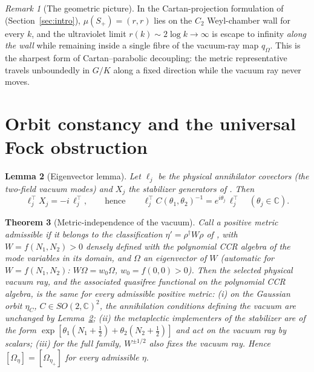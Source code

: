 \documentclass[11pt]{article}
\newtheorem{theorem}{Theorem}[section]
\newtheorem{lemma}[theorem]{Lemma}
\theoremstyle{definition}
\theoremstyle{remark}
\newtheorem{remark}[theorem]{Remark}
\newcommand{\C}{\mathbb{C}}
\newcommand{\dg}{\dagger}
\begin{document}
\begin{remark}[The geometric picture]\label{rem:wall}
In the Cartan-projection formulation of \cite{companion2}
(Section~\ref{sec:intro}), $\mu(S_+)=(r,r)$ lies on the $C_2$
Weyl-chamber wall for every $k$, and the ultraviolet limit
$r(k)\sim2\log k\to\infty$ is escape to infinity \emph{along the wall}
while remaining inside a single fibre of the vacuum-ray map $q_\Omega$.
This is the sharpest form of Cartan--parabolic decoupling: the metric
representative travels unboundedly in $G/K$ along a fixed direction
while the vacuum ray never moves.
\end{remark}

\section{Orbit constancy and the universal Fock obstruction}
\label{sec:obstruction}

\begin{lemma}[Eigenvector lemma]\label{lem:eigen}
Let $\ell_j$ be the physical annihilator covectors (the two-field vacuum
modes) and $X_j$ the stabilizer generators of \cite{companion2}.  Then
\begin{equation}
\ell_j^{\top}X_j=-i\,\ell_j^{\top},
\qquad\text{hence}\qquad
\ell_j^{\top}C(\theta_1,\theta_2)^{-1}=e^{i\theta_j}\,\ell_j^{\top}
\quad(\theta_j\in\C).
\end{equation}
\end{lemma}

\begin{theorem}[Metric-independence of the vacuum]\label{thm:constancy}
Call a positive metric \emph{admissible} if it belongs to the
classification $\eta'=\rho^{\dg}W\rho$ of \cite{companion1}, with
$W=f(N_1,N_2)>0$ densely defined with the polynomial CCR algebra of the
mode variables in its domain, and $\Omega$ an eigenvector of $W$
(automatic for $W=f(N_1,N_2)$: $W\Omega=w_0\Omega$, $w_0=f(0,0)>0$).
Then the selected physical vacuum ray, and the associated quasifree
functional on the polynomial CCR algebra, is the same for every
admissible positive metric:
(i) on the Gaussian orbit $\eta_C$,
$C\in SO(2,\C)^2$, the annihilation conditions defining the vacuum are
unchanged by Lemma~\ref{lem:eigen}; (ii) the metaplectic implementers of
the stabilizer are of the form
$\exp[\theta_1(N_1+\tfrac12)+\theta_2(N_2+\tfrac12)]$ and act on the
vacuum ray by scalars; (iii) for the full family, $W^{\pm1/2}$
also fixes the vacuum ray.  Hence $[\Omega_{\eta}]=[\Omega_{\eta_+}]$ for
every admissible $\eta$.
\end{theorem}
\end{document}
